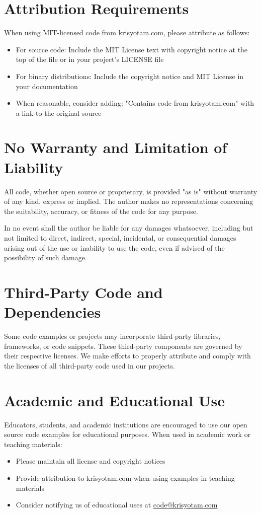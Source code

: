 \documentclass[11pt]{article}
\begin{document}
\section{Attribution Requirements}
When using MIT-licensed code from krisyotam.com, please attribute as follows:
\begin{itemize}
  \item For source code: Include the MIT License text with copyright notice at the top of the file or in your project's LICENSE file
  \item For binary distributions: Include the copyright notice and MIT License in your documentation
  \item When reasonable, consider adding: "Contains code from krisyotam.com" with a link to the original source
\end{itemize}

\section{No Warranty and Limitation of Liability}
All code, whether open source or proprietary, is provided "as is" without warranty of any kind, express or implied. The author makes no representations concerning the suitability, accuracy, or fitness of the code for any purpose.

In no event shall the author be liable for any damages whatsoever, including but not limited to direct, indirect, special, incidental, or consequential damages arising out of the use or inability to use the code, even if advised of the possibility of such damage.

\section{Third-Party Code and Dependencies}
Some code examples or projects may incorporate third-party libraries, frameworks, or code snippets. These third-party components are governed by their respective licenses. We make efforts to properly attribute and comply with the licenses of all third-party code used in our projects.

\section{Academic and Educational Use}
Educators, students, and academic institutions are encouraged to use our open source code examples for educational purposes. When used in academic work or teaching materials:
\begin{itemize}
  \item Please maintain all license and copyright notices
  \item Provide attribution to krisyotam.com when using examples in teaching materials
  \item Consider notifying us of educational uses at \href{mailto:code@krisyotam.com}{code@krisyotam.com}
\end{itemize}
\end{document}
